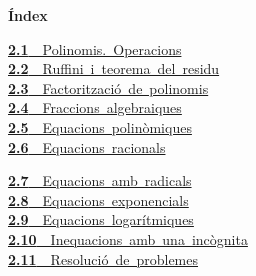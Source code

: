\documentclass[11pt,a4paper]{article}
\begin{document}
\begin{tcolorbox}[colback=fmsurface,colframe=fmsurface,arc=3mm,left=4mm,right=4mm,top=2mm,bottom=2mm]
\small\textbf{Índex}\par\smallskip
\begin{minipage}[t]{0.49\linewidth}\small \mbox{\hyperlink{sec1}{\textbf{\color{fmgreen}2.1}\ \ Polinomis. Operacions}}\\[3pt]
\mbox{\hyperlink{sec2}{\textbf{\color{fmgreen}2.2}\ \ Ruffini i teorema del residu}}\\[3pt]
\mbox{\hyperlink{sec3}{\textbf{\color{fmgreen}2.3}\ \ Factorització de polinomis}}\\[3pt]
\mbox{\hyperlink{sec4}{\textbf{\color{fmgreen}2.4}\ \ Fraccions algebraiques}}\\[3pt]
\mbox{\hyperlink{sec5}{\textbf{\color{fmgreen}2.5}\ \ Equacions polinòmiques}}\\[3pt]
\mbox{\hyperlink{sec6}{\textbf{\color{fmgreen}2.6}\ \ Equacions racionals}}\\[3pt]\end{minipage}\hfill\begin{minipage}[t]{0.49\linewidth}\small \mbox{\hyperlink{sec7}{\textbf{\color{fmgreen}2.7}\ \ Equacions amb radicals}}\\[3pt]
\mbox{\hyperlink{sec8}{\textbf{\color{fmgreen}2.8}\ \ Equacions exponencials}}\\[3pt]
\mbox{\hyperlink{sec9}{\textbf{\color{fmgreen}2.9}\ \ Equacions logarítmiques}}\\[3pt]
\mbox{\hyperlink{sec10}{\textbf{\color{fmgreen}2.10}\ \ Inequacions amb una incògnita}}\\[3pt]
\mbox{\hyperlink{sec11}{\textbf{\color{fmgreen}2.11}\ \ Resolució de problemes}}\\[3pt]\end{minipage}
\end{tcolorbox}

\end{document}
